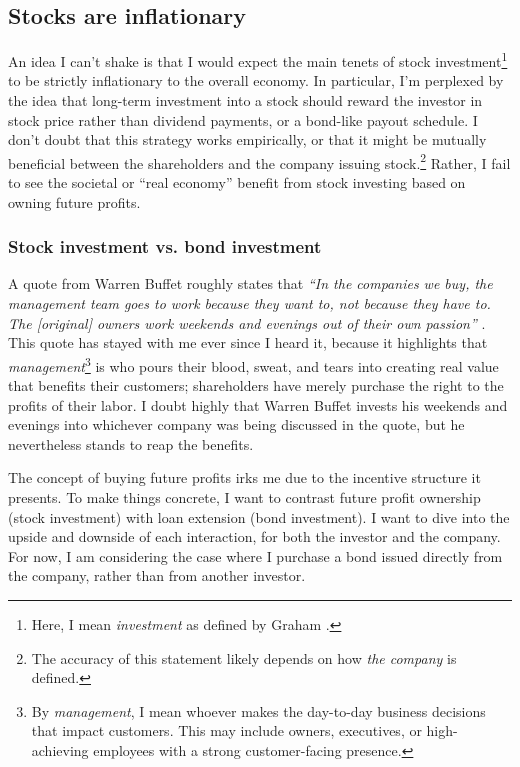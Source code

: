 \subsection{Stocks are inflationary}

An idea I can't shake is that I would expect the main tenets of stock investment\footnote{Here, I mean {\it investment} as defined by Graham \cite{Graham2024}.} to be strictly inflationary to the overall economy.  In particular, I'm perplexed by the idea that long-term investment into a stock should reward the investor in stock price rather than dividend payments, or a bond-like payout schedule.  I don't doubt that this strategy works empirically, or that it might be mutually beneficial between the shareholders and the company issuing stock.\footnote{The accuracy of this statement likely depends on how {\it the company} is defined.}  Rather, I fail to see the societal or ``real economy'' benefit from stock investing based on owning future profits.

\subsubsection{Stock investment vs. bond investment}

A quote from Warren Buffet roughly states that {\it ``In the companies we buy, the management team goes to work because they want to, not because they have to.  The [original] owners work weekends and evenings out of their own passion''} .  This quote has stayed with me ever since I heard it, because it highlights that {\it management}\footnote{By {\it management}, I mean whoever makes the day-to-day business decisions that impact customers.  This may include owners, executives, or high-achieving employees with a strong customer-facing presence.} is who pours their blood, sweat, and tears into creating real value that benefits their customers; shareholders have merely purchase the right to the profits of their labor.  I doubt highly that Warren Buffet invests his weekends and evenings into whichever company was being discussed in the quote, but he nevertheless stands to reap the benefits.

The concept of buying future profits irks me due to the incentive structure it presents.  To make things concrete, I want to contrast future profit ownership (stock investment) with loan extension (bond investment).  I want to dive into the upside and downside of each interaction, for both the investor and the company.  For now, I am considering the case where I purchase a bond issued directly from the company, rather than from another investor.

